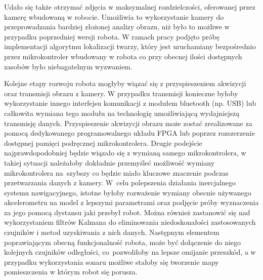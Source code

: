 Udało się także otrzymać zdjęcia w maksymalnej rozdzielczości, oferowanej przez kamerę
wbudowaną w robocie. Umożliwia to wykorzystanie kamery do przeprowadzania
bardziej złożonej analizy obrazu, niż było to możliwe w przypadku poprzedniej
wersji robota. W ramach pracy podjęto próbę implementacji algorytmu
lokalizacji twarzy, który jest uruchamiany bezpośrednio przez mikrokontroler
wbudowany w robota co przy obecnej ilości dostępnych zasobów było niebagatelnym
wyzwaniem.

Kolejne etapy rozwoju robota mogłyby wiązać się z przyspieszeniem akwizycji oraz
transmisji obrazu z kamery. W przypadku transmisji konieczne byłoby
wykorzystanie innego interfejsu komunikacji z modułem bluetooth (np. USB) lub
całkowita wymiana tego modułu na technologię umożliwiającą
wydajniejszą transmisję danych. Przyspieszenie akwizycji obrazu może zostać
zrealizowane za pomocą dedykowanego programowalnego układu FPGA lub poprzez rozszerzenie dostępnej pamięci podręcznej mikrokontrolera.
Drugie podejście najprawdopodobniej będzie wiązało się z wymianą samego
mikrokontrolera, w takiej sytuacji należałoby dokładnie przemyśleć możliwość
wymiany mikrokontrolera na~szybszy co będzie miało kluczowe znaczenie podczas
przetwarzania danych z kamery. W~celu polepszenia działania inercjalnego systemu
nawigacyjnego, istotne byłoby rozważenie wymiany obecnie używanego akcelerometru
na model z lepszymi parametrami oraz podjęcie próby wyznaczenia za jego pomocą
dystansu jaki przebył robot. Można również zastanowić się nad wykorzystaniem
filtrów Kalmana do eliminowania niedoskonałości zastosowanych czujników
i metod uzyskiwania z nich danych. Następnym elementem poprawiającym obecną
funkcjonalność robota, może być dołączenie do niego kolejnych czujników
odległości, co~pozwoliłoby na lepsze omijanie przeszkód, a w przypadku
wykorzystania sonaru możliwe stałoby się tworzenie mapy pomieszczenia w którym
robot się porusza. 
